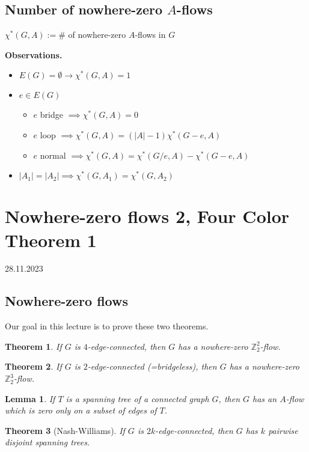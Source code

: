 \documentclass{article}
\newtheorem*{theorem}{Theorem}
\newtheorem*{lemma}{Lemma}
\newcommand{\Z}{\mathbb{Z}}
\begin{document}
\subsection*{Number of nowhere-zero $A$-flows}
$\chi^*(G, A) := \#$ of nowhere-zero $A$-flows in $G$

\noindent
\textbf{Observations.}
\begin{itemize}
	\item $E(G) = \emptyset \rightarrow \chi^*(G,A) = 1$
	\item $e \in E(G)$
		\begin{itemize}
			\item $e$ bridge $\implies \chi^*(G, A) = 0$
			\item $e$ loop $\implies \chi^*(G, A) =
				(|A|-1)\chi^*(G-e,A)$
			\item $e$ normal $\implies \chi^*(G, A) = \chi^*(G / e,
				A) - \chi^*(G - e, A)$
		\end{itemize}
	\item $|A_1| = |A_2| \implies \chi^*(G,A_1) = \chi^*(G,A_2)$
\end{itemize}


\newpage
\section{Nowhere-zero flows 2, Four Color Theorem 1} %
28.11.2023

\subsection*{Nowhere-zero flows}
Our goal in this lecture is to prove these two theorems.

\begin{theorem}
	If $G$ is $4$-edge-connected, then $G$ has a nowhere-zero
	$\Z_2^2$-flow.
\end{theorem}

\begin{theorem}
	If $G$ is $2$-edge-connected (=bridgeless), then $G$ has a nowhere-zero
	$\Z_2^3$-flow.
\end{theorem}

\begin{lemma}
	If $T$ is a spanning tree of a connected graph $G$, then $G$ has an
	$A$-flow which is zero only on a subset of edges of $T$.
\end{lemma}

\begin{theorem}[Nash-Williams]
	If $G$ is $2k$-edge-connected, then $G$ has $k$ pairwise disjoint
	spanning trees.
\end{theorem}
\end{document}

